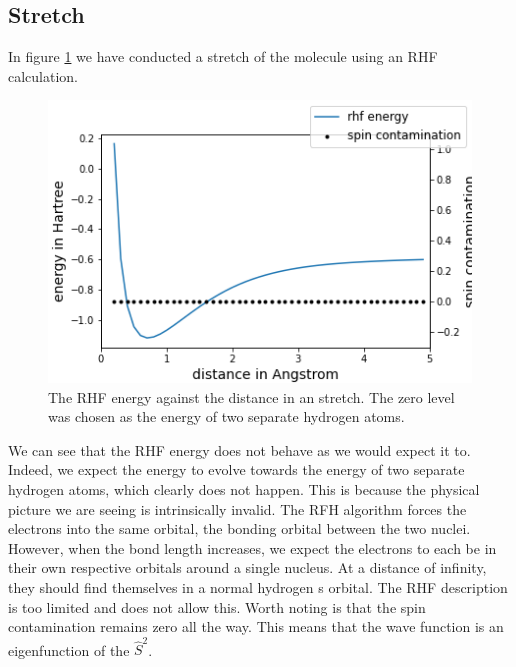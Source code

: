 \documentclass[twoside,twocolumn,9pt]{article}
\begin{document}
\subsection{ Stretch}
\label{subsec:h2}
In figure \ref{fig:rhfstretch} we have conducted a stretch of the  molecule using an RHF calculation.
\begin{center}
  \begin{figure}[h]
    \includegraphics[width=\linewidth]{./../notes/figures/rhf.png}
    \caption{The RHF energy against the distance in an  stretch. The zero level was chosen as the energy of two separate hydrogen atoms.}
    \label{fig:rhfstretch}
  \end{figure}
\end{center}
We can see that the RHF energy does not behave as we would expect it to. Indeed, we expect the energy to evolve towards the energy of two separate hydrogen atoms, which clearly does
not happen. This is because the physical picture we are seeing is intrinsically invalid. The RFH algorithm forces the electrons into the same orbital, the bonding orbital between
the two nuclei. However, when the bond length increases, we expect the electrons to each be in their own respective orbitals around a single nucleus. At a distance of infinity, they
should find themselves in a normal hydrogen s orbital. The RHF description is too limited and does not allow this. Worth noting is that the spin contamination remains zero all the 
way. This means that the wave function is an eigenfunction of the $\hat{S}^2$\cite{Scuseria2011}. \\
\end{document}
